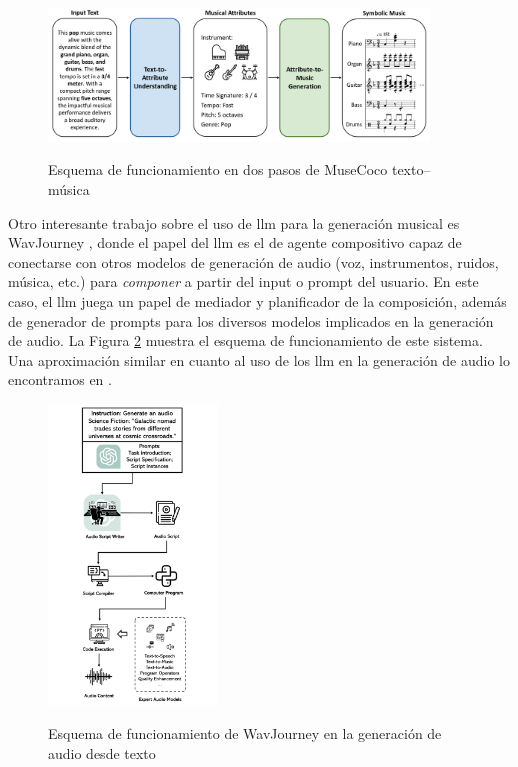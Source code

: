 \begin{figure}[H]
    \caption[Esquema de funcionamiento en dos pasos de MuseCoco texto--música]{Esquema de funcionamiento en dos pasos de MuseCoco texto--música}
    \centering
    \includegraphics[width=0.9\textwidth]{./figuras/musecoco_two_steps.png}
    \label{fig:musecoco}
\end{figure}

Otro interesante trabajo sobre el uso de \gls{llm} para la generación musical es {WavJourney} \citep{liuWavJourneyCompositionalAudio2023}, donde el papel del \gls{llm} es el de agente compositivo capaz de conectarse con otros modelos de generación de audio (voz, instrumentos, ruidos, música, etc.) para \emph{componer} a partir del input o prompt del usuario. En este caso, el \gls{llm} juega un papel de mediador y planificador de la composición, además de generador de prompts para los diversos modelos implicados en la generación de audio. La Figura \ref{fig:wavjourney} muestra el esquema de funcionamiento de este sistema. Una aproximación similar en cuanto al uso de los \gls{llm} en la generación de audio lo encontramos en \cite{borsosAudioLMLanguageModeling2023}.

\begin{figure}[H]
    \caption[Esquema de funcionamiento de {WavJourney}]{Esquema de funcionamiento de WavJourney en la generación de audio desde texto}
    \centering
    \includegraphics[width=0.4\textwidth]{./figuras/WavJourney.png}
    \label{fig:wavjourney}
\end{figure}

